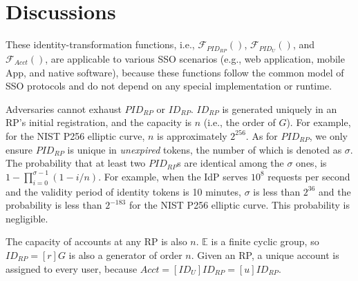 \section{Discussions}
\label{sec:discussion}



These identity-transformation functions, i.e., $\mathcal{F}_{PID_{RP}}()$, $\mathcal{F}_{PID_U}()$, and $\mathcal{F}_{Acct}()$,
    are applicable to various SSO scenarios
        (e.g., web application, mobile App, and native software),
    because these functions follow the common model of SSO protocols
    and do not depend on any special implementation or runtime.



\vspace{0.5mm}
 Adversaries cannot exhaust $PID_{RP}$ or $ID_{RP}$.
$ID_{RP}$ is generated uniquely in an RP's initial registration,
    and the capacity is $n$ (i.e., the order of $G$). For example, for the NIST P256 elliptic curve, $n$ is approximately $2^{256}$.
As for $PID_{RP}$,  we only ensure $PID_{RP}$ is unique in \emph{unexpired} tokens,
    the number of which is denoted as $\sigma$.
The probability that at least two $PID_{RP}$s are identical among the $\sigma$ ones,
    is $1-\prod_{i=0}^{\sigma-1}(1-i/n)$.
For example,
    when the IdP serves $10^{8}$ requests per second and the validity period of identity tokens is 10 minutes,
     $\sigma$ is less than $2^{36}$ and the probability is less than $2^{-183}$ for the NIST P256 elliptic curve.
This probability is negligible.

The capacity of accounts at any RP is also $n$.
$\mathbb{E}$ is a finite cyclic group,
    so $ID_{RP} = [r]G$ is also a generator of order $n$.
Given an RP,
    a unique account is assigned to every user,
        because $Acct =  [ID_U]ID_{RP} = [u]ID_{RP}$.

